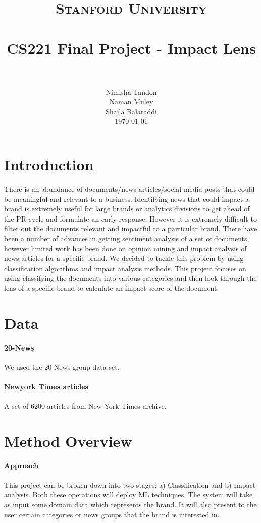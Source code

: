 \documentclass[paper=a4, fontsize=11pt]{scrartcl}
\title{
		\usefont{OT1}{bch}{b}{n}
		\normalfont \normalsize \textsc{Stanford University} \\ [25pt]
		\horrule{0.5pt} \\[0.4cm]
		\huge CS221 Final Project - Impact Lens \\
		\horrule{2pt} \\[0.5cm]
}
\author{
		\normalfont 								\normalsize
        Nimisha Tandon\\[-3pt]		\normalsize
        Naman Muley\\[-3pt]		\normalsize
        Shaila Balaraddi\\[-3pt]		\normalsize
        \today
}
\date{}
\numberwithin{equation}{section}		%
\numberwithin{figure}{section}			%
\numberwithin{table}{section}				%
\begin{document}
\maketitle
\section{Introduction}
There is an abundance of documents/news articles/social media posts that could be meaningful and relevant to a business. Identifying news that could impact a brand is extremely useful for large brands or analytics divisions to get ahead of the PR cycle and formulate an early response. However it is extremely difficult to filter out the documents relevant and impactful to a particular brand. There have been a number of advances in getting sentiment analysis of a set of documents, however limited work has been done on opinion mining and impact analysis of news articles for a specific brand. We decided to tackle this problem by using classification algorithms and impact analysis methods.
This project focuses on using classifying the documents into various categories and then look through the lens of a specific brand to calculate an impact score of the document.





\section{Data}
\paragraph{20-News} We used the 20-News group data set.
\paragraph{Newyork Times articles} A set of 6200 articles from New York Times archive.

\section{Method Overview}
\paragraph{Approach}
This project can be broken down into two stages: a) Classification and b) Impact analysis. Both these operations will deploy ML techniques. The system will take as input some domain data which represents the brand. It will also present to the user certain categories or news groups that the brand is interested in.
\end{document}
